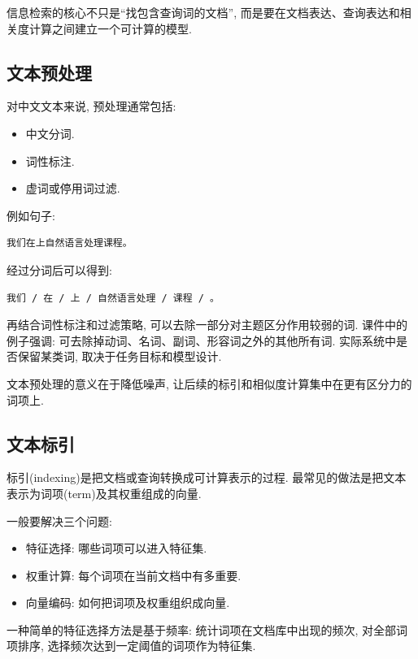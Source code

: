 信息检索的核心不只是“找包含查询词的文档”,
而是要在文档表达、查询表达和相关度计算之间建立一个可计算的模型.

\subsection{文本预处理}


对中文文本来说, 预处理通常包括:

\begin{itemize}
\item 中文分词.
\item 词性标注.
\item 虚词或停用词过滤.
\end{itemize}

例如句子:

\begin{Verbatim}[breaklines=true,breakanywhere=true,fontsize=\small]
我们在上自然语言处理课程。
\end{Verbatim}

经过分词后可以得到:

\begin{Verbatim}[breaklines=true,breakanywhere=true,fontsize=\small]
我们 / 在 / 上 / 自然语言处理 / 课程 / 。
\end{Verbatim}

再结合词性标注和过滤策略, 可以去除一部分对主题区分作用较弱的词.
课件中的例子强调: 可去除掉动词、名词、副词、形容词之外的其他所有词.
实际系统中是否保留某类词, 取决于任务目标和模型设计.

文本预处理的意义在于降低噪声, 让后续的标引和相似度计算集中在更有区分力的词项上.

\subsection{文本标引}


标引(indexing)是把文档或查询转换成可计算表示的过程.
最常见的做法是把文本表示为词项(term)及其权重组成的向量.

一般要解决三个问题:

\begin{itemize}
\item 特征选择: 哪些词项可以进入特征集.
\item 权重计算: 每个词项在当前文档中有多重要.
\item 向量编码: 如何把词项及权重组织成向量.
\end{itemize}

一种简单的特征选择方法是基于频率:
统计词项在文档库中出现的频次, 对全部词项排序, 选择频次达到一定阈值的词项作为特征集.

